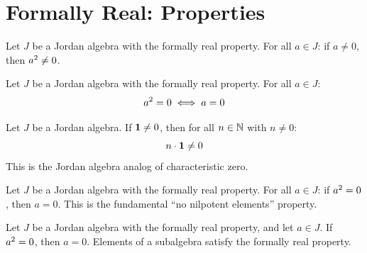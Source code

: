 \section{Formally Real: Properties}

\begin{theorem}
Let $J$ be a Jordan algebra with the formally real property.
For all $a \in J$: if $a \ne 0$, then $a^{2} \ne 0$.
\end{theorem}

\begin{theorem}
Let $J$ be a Jordan algebra with the formally real property.
For all $a \in J$:
\[ a^{2} = 0 \iff a = 0 \]
\end{theorem}

\begin{theorem}
Let $J$ be a Jordan algebra.
If $\mathbf{1} \ne 0$, then for all $n \in \mathbb{N}$ with $n \ne 0$:
\[ n \cdot \mathbf{1} \ne 0 \]
This is the Jordan algebra analog of characteristic zero.
\end{theorem}

\begin{theorem}
Let $J$ be a Jordan algebra with the formally real property.
For all $a \in J$: if $a^{2} = 0$, then $a = 0$.
This is the fundamental ``no nilpotent elements'' property.
\end{theorem}

\begin{theorem}
Let $J$ be a Jordan algebra with the formally real property, and let $a \in J$.
If $a^{2} = 0$, then $a = 0$.
Elements of a subalgebra satisfy the formally real property.
\end{theorem}

